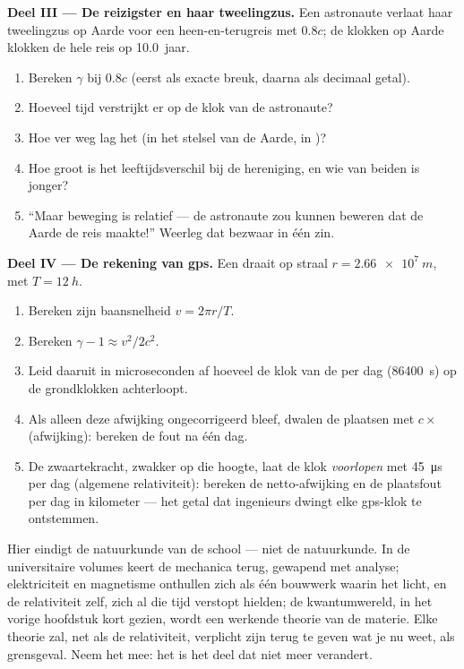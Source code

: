 \begin{problem}
\medskip
\noindent\textbf{Deel III --- De reizigster en haar tweelingzus.}
Een astronaute verlaat haar tweelingzus op Aarde voor een heen-en-terugreis met
$0.8c$; de klokken op Aarde klokken de hele reis op \qty{10.0}{jaar}.
\begin{enumerate}[resume]
  \item Bereken $\gamma$ bij $0.8c$ (eerst als exacte breuk, daarna als
        decimaal getal).
  \item Hoeveel tijd verstrijkt er op de klok van de astronaute?
  \item Hoe ver weg lag het  (in het stelsel van de Aarde, in
        )?
  \item Hoe groot is het leeftijdsverschil bij de hereniging, en wie van beiden
        is jonger?
  \item ``Maar beweging is relatief --- de astronaute zou kunnen beweren dat de
        Aarde de reis maakte!'' Weerleg dat bezwaar in één zin.
\end{enumerate}

\medskip
\noindent\textbf{Deel IV --- De rekening van gps.}
Een  draait op straal $r = \qty{2.66e7}{m}$, met 
$T = \qty{12}{h}$.
\begin{enumerate}[resume]
  \item Bereken zijn baansnelheid $v = 2\pi r/T$.
  \item Bereken $\gamma - 1 \approx v^2/2c^2$.
  \item Leid daaruit in microseconden af hoeveel de klok van de  per
        dag (\qty{86400}{s}) op de grondklokken achterloopt.
  \item Als alleen deze afwijking ongecorrigeerd bleef, dwalen de plaatsen met
        $c \times$ (afwijking): bereken de fout na één dag.
  \item De zwaartekracht, zwakker op die hoogte, laat de klok \emph{voorlopen}
        met \qty{45}{\micro s} per dag (algemene relativiteit): bereken de
        netto-afwijking en de plaatsfout per dag in kilometer --- het getal dat
        ingenieurs dwingt elke gps-klok te ontstemmen.
\end{enumerate}
\end{problem}

\bigskip
\noindent
Hier eindigt de natuurkunde van de school --- niet de natuurkunde. In de
universitaire volumes keert de mechanica terug, gewapend met analyse;
elektriciteit en magnetisme onthullen zich als één bouwwerk waarin het licht,
en de relativiteit zelf, zich al die tijd verstopt hielden; de kwantumwereld,
in het vorige hoofdstuk kort gezien, wordt een werkende theorie van de materie.
Elke theorie zal, net als de relativiteit, verplicht zijn terug te geven wat je
nu weet, als grensgeval. Neem het mee: het is het deel dat niet meer verandert.
